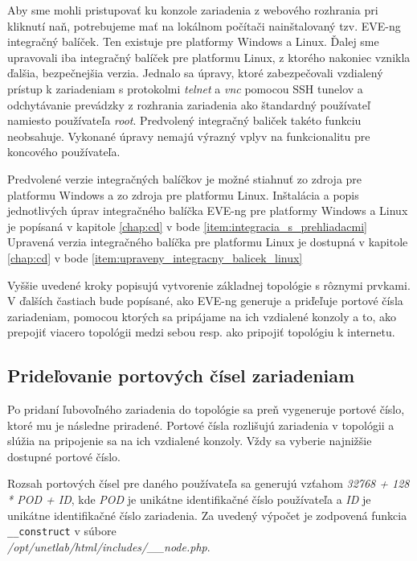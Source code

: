 \begin{enumerate}[noitemsep]
    Aby sme mohli pristupovať ku konzole zariadenia z webového rozhrania pri kliknutí naň, potrebujeme mať na lokálnom počítači nainštalovaný tzv. EVE-ng integračný balíček. Ten existuje pre platformy Windows a Linux. Ďalej sme upravovali iba integračný balíček pre platformu Linux, z ktorého nakoniec vznikla ďalšia, bezpečnejšia verzia. Jednalo sa úpravy, ktoré zabezpečovali vzdialený prístup k zariadeniam s protokolmi \emph{telnet} a \emph{vnc} pomocou SSH tunelov a odchytávanie prevádzky z rozhrania zariadenia ako štandardný používateľ namiesto používateľa \emph{root}. Predvolený integračný baliček takéto funkciu neobsahuje. Vykonané úpravy nemajú výrazný vplyv na funkcionalitu pre koncového používateľa.
    
    Predvolené verzie integračných balíčkov je možné stiahnuť zo zdroja \cite{eve_ng_integration_pack_win} pre platformu Windows a zo zdroja \cite{eve_ng_integration_pack_linux} pre platformu Linux. Inštalácia a popis jednotlivých úprav integračného balíčka EVE-ng pre platformy Windows a Linux je popísaná v kapitole \ref{chap:cd} v bode \ref{item:integracia_s_prehliadacmi} Upravená verzia integračného balíčka pre platformu Linux je dostupná v kapitole \ref{chap:cd} v bode \ref{item:upraveny_integracny_balicek_linux}

\end{enumerate}

Vyššie uvedené kroky popisujú vytvorenie základnej topológie s rôznymi prvkami. V ďalších častiach bude popísané, ako EVE-ng generuje a priďeľuje portové čísla zariadeniam, pomocou ktorých sa pripájame na ich vzdialené konzoly a to, ako prepojiť viacero topológii medzi sebou resp. ako pripojiť topológiu k internetu.




\subsection{Prideľovanie portových čísel zariadeniam}
\label{chap:priradovanie_portovych_cisel}

Po pridaní ľubovoľného zariadenia do topológie sa preň vygeneruje portové číslo, ktoré mu je následne priradené. Portové čísla rozlišujú zariadenia v topológii a  slúžia na pripojenie sa na ich vzdialené konzoly. Vždy sa vyberie najnižšie dostupné portové číslo.

Rozsah portových čísel pre daného používateľa sa generujú vzťahom \emph{32768 + 128 * POD + ID}, kde \emph{POD} je unikátne identifikačné číslo používateľa a \emph{ID} je unikátne identifikačné číslo zariadenia. Za uvedený výpočet je zodpovená funkcia \texttt{\_\_construct} v súbore \\ \emph{/opt/unetlab/html/includes/\_\_node.php}.

